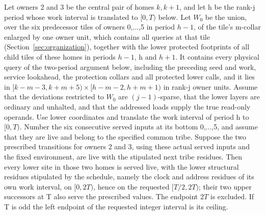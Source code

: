 \begin{lemma}\label{lem:two-period}
Let owners 2 and 3 be the central pair of homes \(k,k+1\), and let h be the rank-j period whose work interval is translated to \([0,T)\) below. Let \(W_0\) be the union, over the six predecessor tiles of owners 0,...,5 in period \(h-1\), of the tile's m-collar enlarged by one owner unit, which contains all queries at that tile (Section~\ref{sec:organization}), together with the lower protected footprints of all child tiles of these homes in periods \(h-1\), h and \(h+1\). It contains every physical query of the two-period argument below, including the preceding seed and work, service lookahead, the protection collars and all protected lower calls, and it lies in \([k-m-3,k+m+5)\times[h-m-2,h+m+1)\) in rank-j owner units. Assume that the deviations restricted to \(W_0\) are \((j- 1)\)-sparse, that the lower layers are ordinary and unhalted, and that the addressed loads supply the true read-only operands. Use lower coordinates and translate the work interval of period h to \([0,T)\). Number the six consecutive served inputs at its bottom 0,...,5, and assume that they are live and belong to the specified common tribe. Suppose the two prescribed transitions for owners 2 and 3, using these actual served inputs and the fixed environment, are live with the stipulated next tribe residues. Then every lower site in those two homes is served live, with the lower structural residues stipulated by the schedule, namely the clock and address residues of its own work interval, on \([0,2T)\), hence on the requested \([T/2,2T)\); their two upper successors at T also serve the prescribed values. The endpoint \(2T\) is excluded. If T is odd the left endpoint of the requested integer interval is its ceiling.
\end{lemma}
